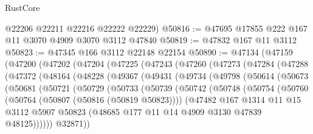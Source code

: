 \begin{lexlean}{RustCore}
\begin{coremodule}
      @22206
      @22211
      @22216
      @22222
      @22229)
@50816 := @47695 @17855 @222 @167 @11 @3070 @4909 @3070 @3112 @47840
@50819 := @47832 @167 @11 @3112
@50823 := @47345 @166 @3112 @22148 @22154
@50890 := @47134
    (@47159
      (@47200
        (@47202
          (@47204
            (@47225
              (@47243
                (@47260
                  (@47273
                    (@47284
                      (@47288
                        (@47372
                          (@48164
                            (@48228
                              (@49367
                                (@49431
                                  (@49734
                                    (@49798
                                      (@50614
                                        (@50673
                                          (@50681
                                            (@50721
                                              (@50729
                                                (@50733
                                                  (@50739
                                                    (@50742
                                                      (@50748
                                                        (@50754
                                                          (@50760
                                                            (@50764
                                                              (@50807 (@50816 (@50819 @50823))))
                                                            (@47482
                                                              @167
                                                              @1314
                                                              @11
                                                              @15
                                                              @3112
                                                              @5907
                                                              @50823
                                                              (@48685
                                                                @177
                                                                @11
                                                                @14
                                                                @4909
                                                                @3130
                                                                @47839
                                                                @48125))))))
                                                    @32871))

\end{coremodule}
\end{lexlean}
